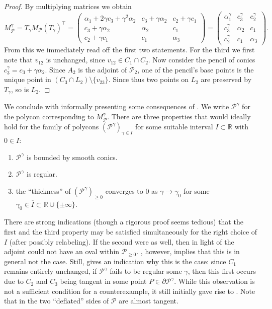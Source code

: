 \documentclass[a4paper,10pt]{amsart}
\theoremstyle{definition}
\theoremstyle{plain}
\newcommand{\cP}{{\mathcal P}}
\newcommand{\R}{{\mathbb R}}
\begin{document}
\begin{proof}
 By multiplying matrices we obtain
 \begin{equation*}
     M_\cP^\gamma = T_\gamma M_{\cP}(T_\gamma)^\top = \begin{pmatrix}
         \alpha_1 + 2\gamma c_3 + \gamma^2 \alpha_2 & c_3 + \gamma \alpha_2 & c_2 + \gamma c_1 \\
         c_3 + \gamma \alpha_2 & \alpha_2 & c_1 \\
         c_2 + \gamma c_1 & c_1 & \alpha_3
     \end{pmatrix} = \begin{pmatrix}
         \alpha_1^\gamma & c_3^\gamma & c_2^\gamma \\
         c_3^\gamma & \alpha_2 & c_1 \\
         c_2^\gamma & c_1 & \alpha_3
     \end{pmatrix}.
 \end{equation*}
 From this we immediately read off the first two statements. For the third we first note that $v_{12}$ is unchanged, since $v_{12} \in C_1 \cap C_2$. Now consider the pencil of conics $c_3^\gamma = c_3 + \gamma \alpha_2$. Since $A_2$ is the adjoint of $\cP_2$, one of the pencil's base points is the unique point in $(C_3 \cap L_2) \setminus \{v_{23}\}$. Since thus two points on $L_2$ are preserved by $T_\gamma$, so is $L_2$.
\end{proof}

We conclude with informally presenting some consequences of . We write $\cP^\gamma$ for the polycon corresponding to $M_\cP^\gamma$. There are three properties that would ideally hold for the family of polycons $(\cP^\gamma)_{\gamma \in I}$ for some suitable interval $I \subset \R$ with $0 \in I$:
\begin{enumerate}
    \item $\cP^\gamma$ is bounded by smooth conics.
    \item $\cP^\gamma$ is regular.
    \item the ``thickness'' of $(\cP^\gamma)_{\geq0}$ converges to $0$ as $\gamma \to \gamma_0$ for some $\gamma_0 \in \overline{I}\subset \R \cup \{\pm\infty\}$.
\end{enumerate}
There are strong indications (though a rigorous proof seems tedious) that the first and the third property may be satisfied simultaneously for the right choice of $I$ (after possibly relabeling). If the second were as well, then in light of  the adjoint could not have an oval within $\cP_{\geq0}$. , however, implies that this is in general not the case. Still,  gives an indication why this is the case: since $C_1$ remains entirely unchanged, if $\cP^\gamma$ fails to be regular some $\gamma$, then this first occurs due to $C_2$ and $C_3$ being tangent in some point $P \in \partial \cP^\gamma$. While this observation is not a sufficient condition for a counterexample, it still initially gave rise to . Note that in  the two ``deflated'' sides of $\cP$ are almost tangent.
\end{document}
